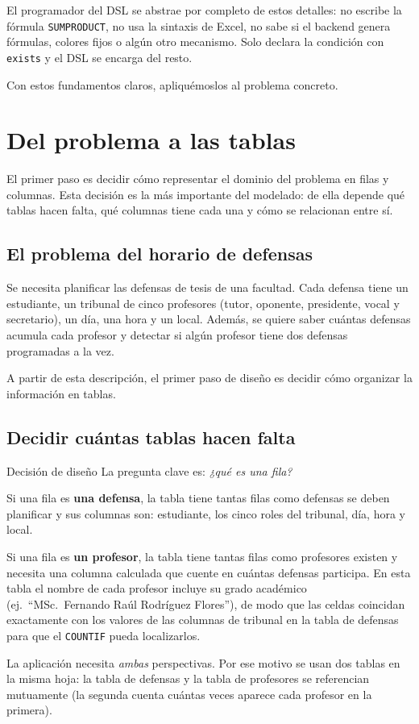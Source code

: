 \documentclass[12pt,a4paper]{report}
\begin{document}
El programador del DSL se abstrae por completo de estos detalles: no
escribe la fórmula \texttt{SUMPRODUCT}, no usa la sintaxis de Excel,
no sabe si el backend genera fórmulas, colores fijos o algún otro
mecanismo.  Solo declara la condición con \texttt{exists} y el DSL se
encarga del resto.

Con estos fundamentos claros, apliquémoslos al problema concreto.

\section{Del problema a las tablas}
\label{sec:modelado}

El primer paso es decidir cómo representar el dominio del problema en filas
y columnas.  Esta decisión es la más importante del modelado: de ella depende
qué tablas hacen falta, qué columnas tiene cada una y cómo se relacionan
entre sí.

\subsection{El problema del horario de defensas}

Se necesita planificar las defensas de tesis de una facultad.  Cada defensa
tiene un estudiante, un tribunal de cinco profesores (tutor, oponente,
presidente, vocal y secretario), un día, una hora y un local.  Además, se
quiere saber cuántas defensas acumula cada profesor y detectar si algún
profesor tiene dos defensas programadas a la vez.

A partir de esta descripción, el primer paso de diseño es decidir cómo
organizar la información en tablas.

\subsection{Decidir cuántas tablas hacen falta}

\begin{decisionbox}{Decisión de diseño}
La pregunta clave es: \emph{¿qué es una fila?}

Si una fila es \textbf{una defensa}, la tabla tiene tantas filas como
defensas se deben planificar y sus columnas son: estudiante, los cinco roles del tribunal,
día, hora y local.

Si una fila es \textbf{un profesor}, la tabla tiene tantas filas como
profesores existen y necesita una columna calculada que cuente en cuántas
defensas participa.  En esta tabla el nombre de cada profesor incluye su
grado académico (ej.\ ``MSc.\ Fernando Raúl Rodríguez Flores''), de modo
que las celdas coincidan exactamente con los valores de las columnas de
tribunal en la tabla de defensas para que el \texttt{COUNTIF} pueda
localizarlos.

La aplicación necesita \emph{ambas} perspectivas.  Por ese motivo se usan
dos tablas en la misma hoja: la tabla de defensas y la tabla de profesores
se referencian mutuamente (la segunda cuenta cuántas veces aparece cada
profesor en la primera).
\end{decisionbox}
\end{document}
